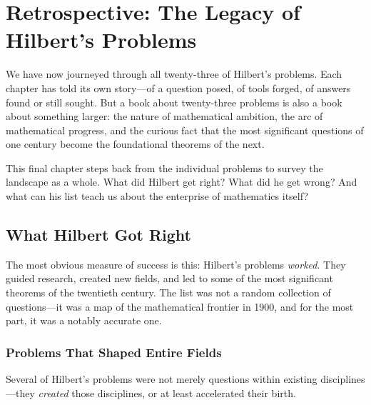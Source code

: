 
\chapter[Retrospective]{Retrospective: The Legacy of Hilbert's Problems}

We have now journeyed through all twenty-three of Hilbert's problems. Each chapter has told its own story---of a question posed, of tools forged, of answers found or still sought. But a book about twenty-three problems is also a book about something larger: the nature of mathematical ambition, the arc of mathematical progress, and the curious fact that the most significant questions of one century become the foundational theorems of the next.

This final chapter steps back from the individual problems to survey the landscape as a whole. What did Hilbert get right? What did he get wrong? And what can his list teach us about the enterprise of mathematics itself?

\section{What Hilbert Got Right}

The most obvious measure of success is this: Hilbert's problems \emph{worked}. They guided research, created new fields, and led to some of the most significant theorems of the twentieth century. The list was not a random collection of questions---it was a map of the mathematical frontier in 1900, and for the most part, it was a notably accurate one.

\subsection{Problems That Shaped Entire Fields}

Several of Hilbert's problems were not merely questions within existing disciplines---they \emph{created} those disciplines, or at least accelerated their birth.

